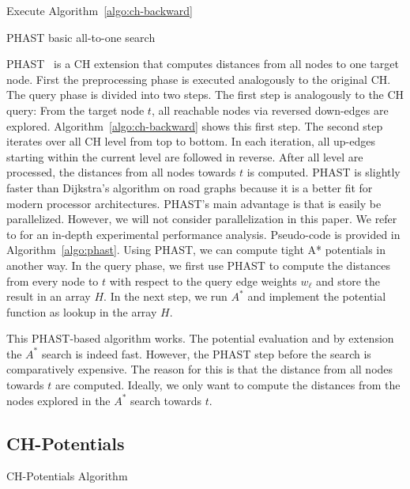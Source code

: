 \documentclass[letterpaper]{article} %
\begin{document}
\begin{algorithm2e}
Execute Algorithm~\ref{algo:ch-backward}\;
\caption{PHAST basic all-to-one search}
\label{algo:phast}
\end{algorithm2e}

PHAST~\cite{dgnw-phast-13} is a CH extension that computes distances from all nodes to one target node.
First the preprocessing phase is executed analogously to the original CH.
The query phase is divided into two steps.
The first step is analogously to the CH query:
From the target node $t$, all reachable nodes via reversed down-edges are explored.
Algorithm~\ref{algo:ch-backward} shows this first step.
The second step iterates over all CH level from top to bottom.
In each iteration, all up-edges starting within the current level are followed in reverse.
After all level are processed, the distances from all nodes towards $t$ is computed.
PHAST is slightly faster than Dijkstra's algorithm on road graphs because it is a better fit for modern processor architectures.
PHAST's main advantage is that is easily be parallelized.
However, we will not consider parallelization in this paper.
We refer to \cite{dgnw-phast-13} for an in-depth experimental performance analysis.
Pseudo-code is provided in Algorithm~\ref{algo:phast}.
Using PHAST, we can compute tight A* potentials in another way.
In the query phase, we first use PHAST to compute the distances from every node to $t$ with respect to the query edge weights $w_\ell$ and store the result in an array $H$.
In the next step, we run $A^*$ and implement the potential function as lookup in the array $H$.

This PHAST-based algorithm works.
The potential evaluation and by extension the $A^*$ search is indeed fast.
However, the PHAST step before the search is comparatively expensive.
The reason for this is that the distance from all nodes towards $t$ are computed.
Ideally, we only want to compute the distances from the nodes explored in the $A^*$ search towards $t$.

\subsection{CH-Potentials}

\begin{algorithm2e}
\caption{CH-Potentials Algorithm}
\label{algo:pot}
\end{algorithm2e}
\end{document}
